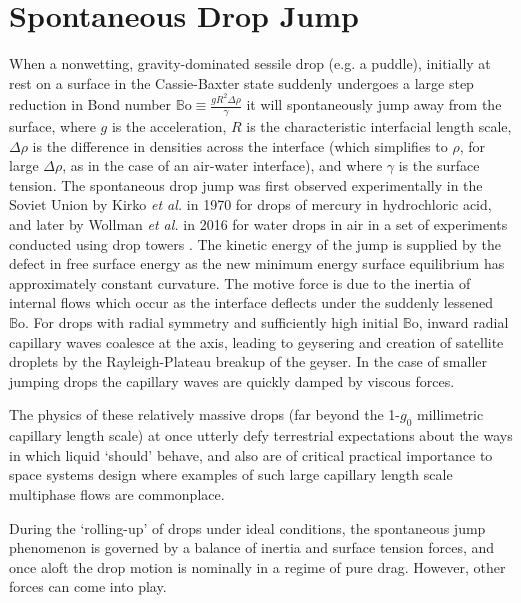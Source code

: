 \documentclass[aip,reprint, floatfix]{revtex4-1}
\begin{document}
\section{Spontaneous Drop Jump}
When a nonwetting, gravity-dominated sessile drop (e.g. a puddle), initially at rest on a surface in the Cassie-Baxter state suddenly undergoes a large step reduction in Bond number $\mathbb{B}\mbox{o} \equiv \frac{g R^2 \Delta \rho}{\gamma}$ it will spontaneously jump away from the surface, where $g$ is the acceleration, $R$ is the characteristic interfacial length scale, $\Delta \rho$ is the difference in densities across the interface (which simplifies to $\rho$, for large $\Delta \rho$, as in the case of an air-water interface), and where $\gamma$ is the surface tension. The spontaneous drop jump was first observed experimentally in the Soviet Union by Kirko \emph{et al.} \cite{kirko_phenomenon_1970} in 1970 for drops of mercury in hydrochloric acid, and later by Wollman \emph{et al.} in 2016 for water drops in air in a set of experiments conducted using drop towers \cite{wollman_more_2016}. The kinetic energy of the jump is supplied by the defect in free surface energy as the new minimum energy surface equilibrium has approximately constant curvature. The motive force is due to the inertia of internal flows which occur as the interface deflects under the suddenly lessened $\mathbb{B}\mbox{o}$. For drops with radial symmetry and sufficiently high initial $\mathbb{B}\mbox{o}$, inward radial capillary waves coalesce at the axis, leading to geysering and creation of satellite droplets by the Rayleigh-Plateau breakup of the geyser. In the case of smaller jumping drops the capillary waves are quickly damped by viscous forces.

The physics of these relatively massive drops (far beyond the 1-$g_0$ millimetric capillary length scale) at once utterly defy terrestrial expectations about the ways in which liquid `should' behave, and also are of critical practical importance to space systems design where examples of such large capillary length scale multiphase flows are commonplace.

During the `rolling-up' of drops under ideal conditions, the spontaneous jump phenomenon is governed by a balance of inertia and surface tension forces, and once aloft the drop motion is nominally in a regime of pure drag. However, other forces can come into play. 
\end{document}
